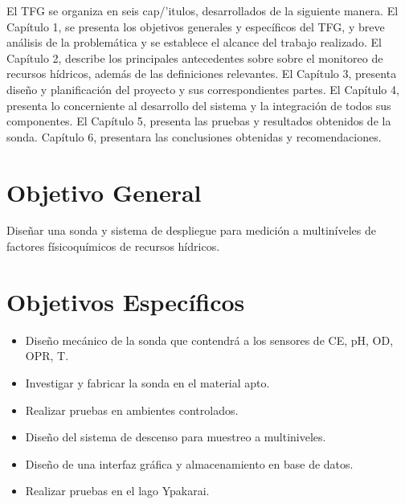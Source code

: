 El TFG  se organiza en seis cap/'itulos, desarrollados de la siguiente manera. 
El Capítulo 1, se presenta los objetivos generales y espec\'ificos del TFG,  y breve an\'alisis de la problem\'atica y se establece el alcance del trabajo realizado.
El Capítulo 2, describe los principales antecedentes sobre sobre el monitoreo de recursos h\'idricos, adem\'as de las definiciones relevantes. 
El Capítulo 3, presenta dise\~no y planificaci\'on del proyecto y sus correspondientes partes.
El Capítulo 4, presenta lo concerniente al desarrollo del sistema y la integraci\'on de todos sus componentes.   
El Capítulo 5, presenta las pruebas y resultados obtenidos de la sonda. 
Capítulo 6,  presentara las conclusiones obtenidas y recomendaciones.
    \section{Objetivo General}
Dise\~nar una sonda y sistema de despliegue para medici\'on a multin\'iveles de factores f\'isicoqu\'imicos de recursos h\'idricos.


\section{Objetivos Específicos}
\begin{itemize}
	\item Dise\~no mec\'anico de la sonda que contendr\'a a los sensores de CE, pH, OD, OPR, T.
    \item Investigar y fabricar  la sonda en el material apto.
    \item Realizar pruebas en ambientes controlados.
    \item Dise\~no del sistema de descenso para muestreo a multiniveles.
    \item Dise\~no de una interfaz gr\'afica y almacenamiento en base de datos.  
    \item Realizar pruebas en el lago Ypakarai.

\end{itemize}

